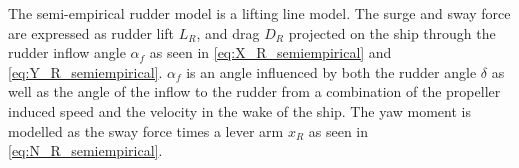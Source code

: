 
The semi-empirical rudder model is a lifting line model. The surge and sway force are expressed as rudder lift $L_R$, and drag $D_R$ projected on the ship through the rudder inflow angle $\alpha_f$ as seen in \autoref{eq:X_R_semiempirical} and \autoref{eq:Y_R_semiempirical}. $\alpha_f$ is an angle influenced by both the rudder angle $\delta$ as well as the angle of the inflow to the rudder from a combination of the propeller induced speed and the velocity in the wake of the ship. The yaw moment is modelled as the sway force times a lever arm $x_R$ as seen in \autoref{eq:N_R_semiempirical}.
\begin{equation}
    \label{eq:X_R_semiempirical}
    
\end{equation}
%
\begin{equation}
    \label{eq:Y_R_semiempirical}
    
\end{equation}
%
\begin{equation}
    \label{eq:N_R_semiempirical}
    
\end{equation}

